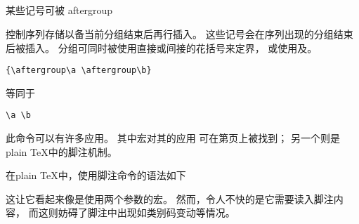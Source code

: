 \documentclass{book}
\begin{document}
\subsection{\protect{}}
\label{sec:aftergroup}

某些记号可被
\cstoidx aftergroup\par
\begin{disp}\end{disp}
控制序列存储以备当前分组结束后再行插入。
这些记号会在序列出现的分组结束后被插入。
分组可同时被使用直接或间接的花括号来定界，
或使用及。

\begin{example}
\begin{verbatim}
{\aftergroup\a \aftergroup\b}
\end{verbatim}
等同于
\begin{verbatim}
\a \b
\end{verbatim}
\end{example}

此命令可以有许多应用。
其中宏对其的应用
可在第\pageref{text:vcenter}页上被找到；
另一个则是plain {\TeX}中的脚注机制。

在plain {\TeX}中，使用脚注命令的语法如下
\label{footnote:ex}
\begin{disp}\lb{}\rb
\end{disp} 这让它看起来像是使用两个参数的宏。
然而，令人不快的是它需要读入脚注内容，
而这则妨碍了脚注中出现如类别码变动等情况。
\end{document}
